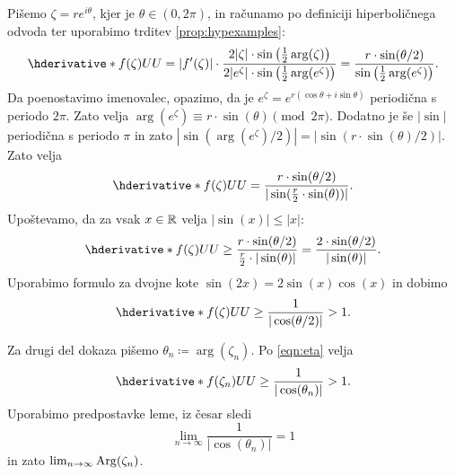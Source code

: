 \begin{dokaz}
    Pišemo \(\zeta = r e^{i \theta}\), kjer je \(\theta \in (0, 2 \pi)\), in računamo po definiciji hiperboličnega odvoda ter uporabimo trditev \ref{prop:hypexamples}:
    \[
        \hder{f (\zeta)}{U}{U}
        =
        |f' (\zeta)| \cdot \frac{2 |\zeta| \cdot \sin \prt{\frac{1}{2} \arg (\zeta)}}{2 |e^{\zeta}| \cdot \sin \prt{\frac{1}{2} \arg (e^{\zeta})}}
        =
        \frac{r \cdot \sin (\theta / 2)}{\sin \prt{\frac{1}{2} \arg (e^{\zeta})}}.    
    \]
    Da poenostavimo imenovalec, opazimo, da je \(e^{\zeta} = e^{r (\cos \theta + i \sin \theta)}\) periodična s periodo \(2 \pi\). Zato velja \(\arg (e^{\zeta}) \equiv r \cdot \sin (\theta) \pmod{2 \pi}\). Dodatno je še \(|\sin|\) periodična s periodo \(\pi\) in zato \(|\sin (\arg (e^{\zeta}) / 2)| = |\sin (r \cdot \sin (\theta) / 2)|\). Zato velja
    \[\hder{f (\zeta)}{U}{U} = \frac{r \cdot \sin (\theta / 2)}{|\sin (\frac{r}{2} \cdot \sin (\theta))|}.\]
    Upoštevamo, da za vsak \(x \in \mathbb R\) velja \(|\sin (x)| \leq |x|\):
    \[\hder{f (\zeta)}{U}{U} \geq \frac{r \cdot \sin (\theta / 2)}{\frac{r}{2} \cdot |\sin (\theta)|} = \frac{2 \cdot \sin (\theta / 2)}{|\sin (\theta)|}.\]
    Uporabimo formulo za dvojne kote \(\sin (2 x) = 2 \sin (x) \cos (x)\) in dobimo
    \begin{equation} \label{eqn:eta}
        \hder{f (\zeta)}{U}{U} \geq \frac{1}{|\cos (\theta / 2)|} > 1.
    \end{equation}

    \noindent Za drugi del dokaza pišemo \(\theta_n \coloneq \arg (\zeta_n)\). Po \eqref{eqn:eta} velja
    \[\hder{f (\zeta_n)}{U}{U} \geq \frac{1}{|\cos (\theta_n)|} > 1.\]
    Uporabimo predpostavke leme, iz česar sledi
    \[\lim_{n \to \infty} \frac{1}{|\cos (\theta_n)|} = 1\]
    in zato \(\lim_{n \to \infty} \operatorname{Arg} (\zeta_n)\).
\end{dokaz}



